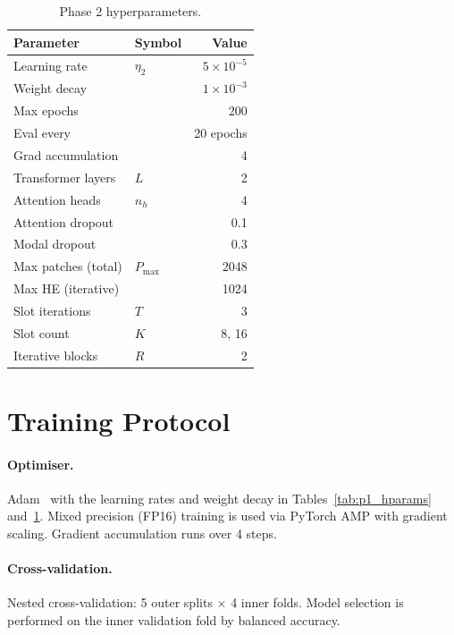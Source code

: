 \documentclass[11pt,a4paper]{article}
\begin{document}
\begin{table}[h]
\centering
\caption{Phase 2 hyperparameters.}
\label{tab:p2_hparams}
\begin{tabular}{llr}
\toprule
Parameter & Symbol & Value \\
\midrule
Learning rate       & $\eta_2$ & $5\times10^{-5}$ \\
Weight decay        &          & $1\times10^{-3}$ \\
Max epochs          &          & 200 \\
Eval every          &          & 20 epochs \\
Grad accumulation   &          & 4 \\
Transformer layers  & $L$      & 2 \\
Attention heads     & $n_h$    & 4 \\
Attention dropout   &          & 0.1 \\
Modal dropout       &          & 0.3 \\
Max patches (total) & $P_\text{max}$ & 2048 \\
Max HE (iterative)  &          & 1024 \\
Slot iterations     & $T$      & 3 \\
Slot count          & $K$      & 8, 16 \\
Iterative blocks    & $R$      & 2 \\
\bottomrule
\end{tabular}
\end{table}

\section{Training Protocol}

\paragraph{Optimiser.}
Adam~\cite{kingma2014adam} with the learning rates and weight decay in
Tables~\ref{tab:p1_hparams} and~\ref{tab:p2_hparams}.
Mixed precision (FP16) training is used via PyTorch AMP with gradient scaling.
Gradient accumulation runs over 4 steps.

\paragraph{Cross-validation.}
Nested cross-validation: 5 outer splits $\times$ 4 inner folds.
Model selection is performed on the inner validation fold by balanced accuracy.
\end{document}
